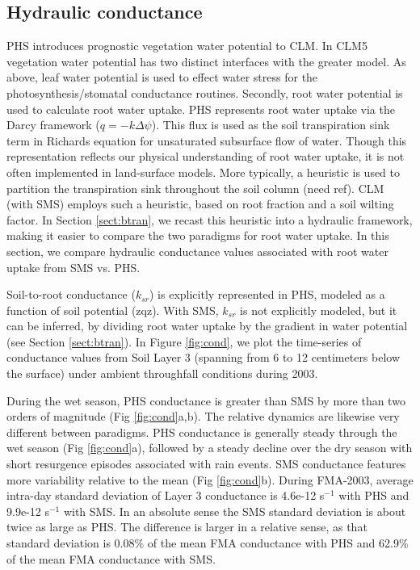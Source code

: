 \documentclass[draft,linenumbers]{agujournal}
\begin{document}
\subsection{Hydraulic conductance}

PHS introduces prognostic vegetation water potential to CLM.
In CLM5 vegetation water potential has two distinct interfaces with the greater model.
As above, leaf water potential is used to effect water stress for the photosynthesis/stomatal conductance routines.
Secondly, root water potential is used to calculate root water uptake.
PHS represents root water uptake via the Darcy framework ($q=-k\Delta\psi$).
This flux is used as the soil transpiration sink term in Richards equation for unsaturated subsurface flow of water.
Though this representation reflects our physical understanding of root water uptake, it is not often implemented in land-surface models.
More typically, a heuristic is used to partition the transpiration sink throughout the soil column (need ref).
CLM (with SMS) employs such a heuristic, based on root fraction and a soil wilting factor. 
In Section \ref{sect:btran}, we recast this heuristic into a hydraulic framework, making it easier to compare the two paradigms for root water uptake.
In this section, we compare hydraulic conductance values associated with root water uptake from SMS vs. PHS.

Soil-to-root conductance ($k_{sr}$) is explicitly represented in PHS, modeled as a function of soil potential (zqz).
With SMS, $k_{sr}$ is not explicitly modeled, but it can be inferred, by dividing root water uptake by the gradient in water potential (see Section \ref{sect:btran}).
In Figure \ref{fig:cond}, we plot the time-series of conductance values from Soil Layer 3 (spanning from 6 to 12 centimeters below the surface) under ambient throughfall conditions during 2003.

During the wet season, PHS conductance is greater than SMS by more than two orders of magnitude (Fig \ref{fig:cond}a,b).
The relative dynamics are likewise very different between paradigms.
PHS conductance is generally steady through the wet season (Fig \ref{fig:cond}a), followed by 
a steady decline over the dry season with short resurgence episodes associated with rain events.
SMS conductance features more variability relative to the mean (Fig \ref{fig:cond}b).
During FMA-2003, average intra-day standard deviation of Layer 3 conductance is 4.6e-12 s$^{-1}$ with PHS and 9.9e-12 s$^{-1}$ with SMS. 
In an absolute sense the SMS standard deviation is about twice as large as PHS.
The difference is larger in a relative sense, as that standard deviation is 0.08\% of the mean FMA conductance with PHS
and 62.9\% of the mean FMA conductance with SMS.
\end{document}
